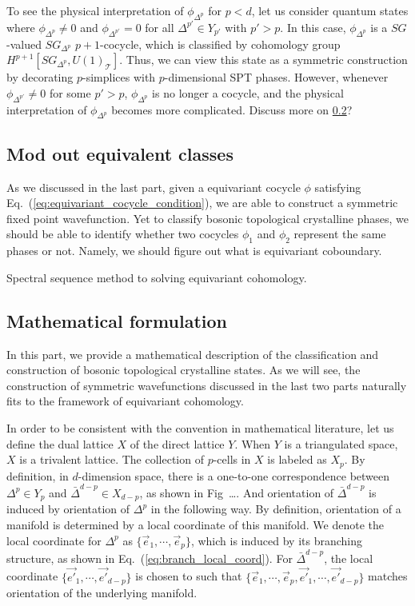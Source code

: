 \documentclass[%
  reprint,
  amsmath,amssymb,
  aps,pra,
]{revtex4-1}
\newcommand{\TT}{\mathcal{T}} %
\begin{document}
To see the physical interpretation of $\phi_{\Delta^p}$ for $p<d$, let us consider quantum states where $\phi_{\Delta^p}\neq 0$ and $\phi_{\Delta^{p'}}=0$ for all $\Delta^{p'}\in Y_{p'}$ with $p'>p$. 
In this case, $\phi_{\Delta^p}$ is a $SG$-valued $SG_{\Delta^p}$ $p+1$-cocycle, which is classified by cohomology group $H^{p+1}[SG_{\Delta^p},U(1)_{\TT}]$.
Thus, we can view this state as a symmetric construction by decorating $p$-simplices with $p$-dimensional SPT phases.
However, whenever $\phi_{\Delta^{p'}}\neq 0$ for some $p'>p$, $\phi_{\Delta^p}$ is no longer a cocycle, and the physical interpretation of $\phi_{\Delta^p}$ becomes more complicated.
{\color{red} Discuss more on \ref{subapp:equivariant_cohomology_math_formulation}?}

\subsection{Mod out equivalent classes}
As we discussed in the last part, given a equivariant cocycle $\phi$ satisfying Eq.~(\ref{eq:equivariant_cocycle_condition}), we are able to construct a symmetric fixed point wavefunction.
Yet to classify bosonic topological crystalline phases, we should be able to identify whether two cocycles $\phi_1$ and $\phi_2$ represent the same phases or not.
Namely, we should figure out what is equivariant coboundary.

{\color{red} Spectral sequence method to solving equivariant cohomology.}

\subsection{Mathematical formulation}\label{subapp:equivariant_cohomology_math_formulation}
In this part, we provide a mathematical description of the classification and construction of bosonic topological crystalline states.
As we will see, the construction of symmetric wavefunctions discussed in the last two parts naturally fits to the framework of equivariant cohomology\cite{Brown2012cohomology,ThorngrenElse2018gauging}. 

In order to be consistent with the convention in mathematical literature, let us define the dual lattice $X$ of the direct lattice $Y$.
When $Y$ is a triangulated space, $X$ is a trivalent lattice.
The collection of $p$-cells in $X$ is labeled as $X_p$.
By definition, in $d$-dimension space, there is a one-to-one correspondence between ${\Delta^p}\in Y_p$ and $\bar{\Delta}^{d-p}\in X_{d-p}$, as shown in Fig~\ldots.
And orientation of $\bar{\Delta}^{d-p}$ is induced by orientation of $\Delta^p$ in the following way.
By definition, orientation of a manifold is determined by a local coordinate of this manifold.
We denote the local coordinate for $\Delta^p$ as $\{\vec{e}_1,\cdots,\vec{e}_p\}$, which is induced by its branching structure, as shown in Eq.~(\ref{eq:branch_local_coord}).
For $\bar{\Delta}^{d-p}$, the local coordinate $\{\vec{e'}_1,\cdots,\vec{e'}_{d-p}\}$ is chosen to such that $\{\vec{e}_1,\cdots,\vec{e}_p,\vec{e'}_1,\cdots,\vec{e'}_{d-p}\}$ matches orientation of the underlying manifold.
\end{document}
